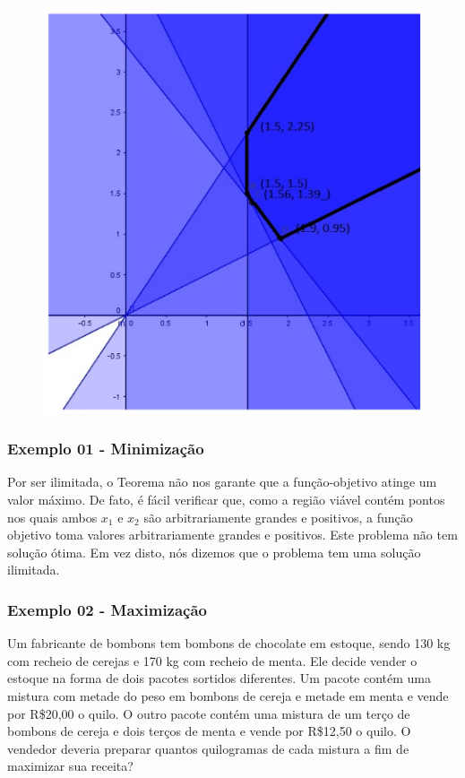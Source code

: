 \documentclass[hyperref={pdfpagelabels=false}]{beamer}
\begin{document}
\begin{frame}
\begin{figure}[!h]
	\centering
	\includegraphics[scale=0.5]{ex1}
	\label{ex1}
\end{figure}
\end{frame}

\begin{frame}
\frametitle{Exemplo 01 - Minimização}

Por ser ilimitada, o Teorema não nos garante que a função-objetivo atinge um valor máximo. De fato, é fácil verificar que, como a região viável contém pontos nos quais ambos $x_1$ e $x_2$ são arbitrariamente grandes e positivos, a função objetivo toma valores arbitrariamente grandes e positivos. Este problema não tem solução ótima. Em vez disto, nós dizemos que o problema tem uma solução ilimitada.

\end{frame}

\begin{frame}
\frametitle{Exemplo 02 - Maximização} 

Um fabricante de bombons tem bombons de chocolate em estoque, sendo 130 kg com recheio de cerejas e 170 kg com recheio de menta. Ele decide vender o estoque na forma de dois pacotes sortidos diferentes. Um pacote contém uma mistura com metade do peso em bombons de cereja e metade em menta e vende por R\$20,00 o quilo. O outro pacote contém uma mistura de um terço de bombons de cereja e dois terços de menta e vende por R\$12,50 o quilo. O vendedor deveria preparar quantos quilogramas de cada mistura a fim de maximizar sua receita?

\end{frame}
\end{document}
